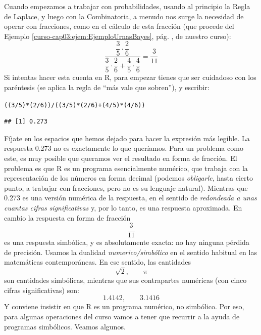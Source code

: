 \documentclass[10pt,a4paper]{article}\usepackage[]{graphicx}\usepackage[]{color}
\makeatletter
\newcommand{\hlnum}[1]{\textcolor[rgb]{0.686,0.059,0.569}{#1}}%
\newcommand{\hlopt}[1]{\textcolor[rgb]{0,0,0}{#1}}%
\newcommand{\hlstd}[1]{\textcolor[rgb]{0.345,0.345,0.345}{#1}}%
\newenvironment{kframe}{%
 \def\at@end@of@kframe{}%
 \ifinner\ifhmode%
  \def\at@end@of@kframe{\end{minipage}}%
  \begin{minipage}{\columnwidth}%
 \fi\fi%
 \def\FrameCommand##1{\hskip\@totalleftmargin \hskip-\fboxsep
 \colorbox{shadecolor}{##1}\hskip-\fboxsep
     \hskip-\linewidth \hskip-\@totalleftmargin \hskip\columnwidth}%
 \MakeFramed {\advance\hsize-\width
   \@totalleftmargin\z@ \linewidth\hsize
   \@setminipage}}%
 {\par\unskip\endMakeFramed%
 \at@end@of@kframe}
\newenvironment{knitrout}{}{} %
\newcounter {cont01}
\makeatother
\begin{document}
Cuando empezamos a trabajar con probabilidades, usando al principio la Regla de Laplace, y luego con la Combinatoria, a menudo nos surge la necesidad de operar con fracciones,  como en el cálculo de esta fracción (que procede del Ejemplo \ref{curso-cap03:ejem:EjemploUrnasBayes}, pág. \pageref{curso-cap03:ejem:EjemploUrnasBayes}, de nuestro curso):
\[
\dfrac{\dfrac{3}{5}\cdot \dfrac{2}{6}}{\dfrac{3}{5}\cdot \dfrac{2}{6}+\dfrac{4}{5}\cdot\dfrac{4}{6}}=\dfrac{3}{11}
\]
Si intentas hacer esta cuenta en R, para empezar tienes que ser cuidadoso con los paréntesis (se aplica la regla de ``más vale que sobren''), y escribir:
\begin{knitrout}
\color{fgcolor}\begin{kframe}
\begin{alltt}
    \hlstd{( (}\hlnum{3}\hlopt{/}\hlnum{5}\hlstd{)} \hlopt{*} \hlstd{(}\hlnum{2}\hlopt{/}\hlnum{6}\hlstd{) )} \hlopt{/}\hlstd{( (}\hlnum{3}\hlopt{/}\hlnum{5}\hlstd{)} \hlopt{*} \hlstd{(}\hlnum{2}\hlopt{/}\hlnum{6}\hlstd{)} \hlopt{+} \hlstd{(}\hlnum{4}\hlopt{/}\hlnum{5}\hlstd{)} \hlopt{*} \hlstd{(}\hlnum{4}\hlopt{/}\hlnum{6}\hlstd{) )}
\end{alltt}
\begin{verbatim}
## [1] 0.273
\end{verbatim}
\end{kframe}
\end{knitrout}
Fíjate en los espacios que hemos dejado para hacer la expresión más legible. La respuesta
0.273
no es exactamente lo que queríamos. Para un problema como este, es muy posible que queramos ver el resultado en forma de fracción. El problema es que R es un programa esencialmente {\sf numérico}, que trabaja con la representación de los números en forma decimal (podemos {\em obligarle}, hasta cierto punto, a trabajar con fracciones, pero no es su lenguaje natural). Mientras que 0.273 es una versión {\sf numérica} de la respuesta, en el sentido de {\em redondeada a unas cuantas cifras significativas} y, por lo tanto, es una respuesta aproximada. En cambio la respuesta en forma de fracción
\[
\dfrac{3}{11}
\]
es una respuesta {\sf simbólica}, y es absolutamente exacta: no hay ninguna pérdida de precisión. Usamos la dualidad {\em numerico/simbólico} en el sentido habitual en las matemáticas contemporáneas. En ese sentido, las cantidades
\[\sqrt{2},\qquad \pi\]
son cantidades simbólicas, mientras que sus contrapartes numéricas (con cinco cifras significativas) son:
\[1.4142,\qquad 3.1416\]
Y conviene insistir en que R es un programa numérico, no simbólico. Por eso, para algunas operaciones del curso vamos a tener que recurrir a la ayuda de programas simbólicos. Veamos algunos.
\end{document}

